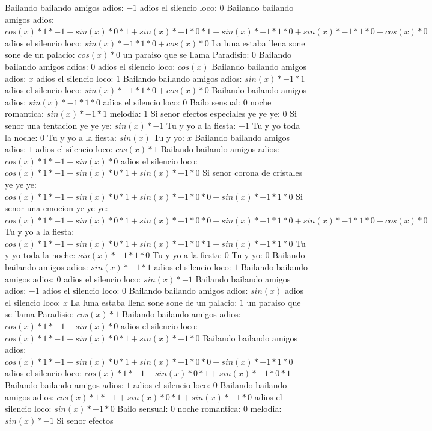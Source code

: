 \documentclass{article}
\begin{document}
Bailando bailando amigos adios: $-1$ adios el silencio loco: $0$  \newline Bailando bailando amigos adios: ${{cos(x)*1*-1+sin(x)*0}*1+sin(x)*-1*0}*1+sin(x)*-1*1*0+sin(x)*-1*1*0+cos(x)*0$  \newline adios el silencio loco: $sin(x)*-1*1*0+cos(x)*0$  \newline La luna estaba llena sone sone de un palacio: $cos(x)*0$ un paraiso que se llama Paradisio: $0$ Bailando bailando amigos adios: $0$  \newline adios el silencio loco: $cos(x)$  \newline Bailando bailando amigos adios: $x$ adios el silencio loco: $1$  \newline Bailando bailando amigos adios: $sin(x)*-1*1$ adios el silencio loco: $sin(x)*-1*1*0+cos(x)*0$ Bailando bailando amigos adios: $sin(x)*-1*1*0$ adios el silencio loco: $0$ Bailo sensual: $0$  \newline noche romantica: $sin(x)*-1*1$ melodia: $1$ Si senor efectos especiales ye ye ye: $0$  \newline Si senor una tentacion ye ye ye: $sin(x)*-1$ Tu y yo a la fiesta: $-1$ Tu y yo toda la noche: $0$  \newline Tu y yo a la fiesta: $sin(x)$  \newline Tu y yo: $x$ Bailando bailando amigos adios: $1$  \newline adios el silencio loco: $cos(x)*1$ Bailando bailando amigos adios: $cos(x)*1*-1+sin(x)*0$ adios el silencio loco: ${cos(x)*1*-1+sin(x)*0}*1+sin(x)*-1*0$ Si senor corona de cristales ye ye ye: ${{cos(x)*1*-1+sin(x)*0}*1+sin(x)*-1*0}*0+sin(x)*-1*1*0$ Si senor una emocion ye ye ye: ${{cos(x)*1*-1+sin(x)*0}*1+sin(x)*-1*0}*0+sin(x)*-1*1*0+sin(x)*-1*1*0+cos(x)*0$ Tu y yo a la fiesta: ${{cos(x)*1*-1+sin(x)*0}*1+sin(x)*-1*0}*1+sin(x)*-1*1*0$  \newline Tu y yo toda la noche: $sin(x)*-1*1*0$ Tu y yo a la fiesta: $0$ Tu y yo: $0$  \newline Bailando bailando amigos adios: $sin(x)*-1*1$ adios el silencio loco: $1$ Bailando bailando amigos adios: $0$  \newline adios el silencio loco: $sin(x)*-1$ Bailando bailando amigos adios: $-1$ adios el silencio loco: $0$  \newline Bailando bailando amigos adios: $sin(x)$  \newline adios el silencio loco: $x$ La luna estaba llena sone sone de un palacio: $1$  \newline un paraiso que se llama Paradisio: $cos(x)*1$ Bailando bailando amigos adios: $cos(x)*1*-1+sin(x)*0$ adios el silencio loco: ${cos(x)*1*-1+sin(x)*0}*1+sin(x)*-1*0$ Bailando bailando amigos adios: ${{cos(x)*1*-1+sin(x)*0}*1+sin(x)*-1*0}*0+sin(x)*-1*1*0$ adios el silencio loco: ${{cos(x)*1*-1+sin(x)*0}*1+sin(x)*-1*0}*1$ Bailando bailando amigos adios: $1$ adios el silencio loco: $0$  \newline Bailando bailando amigos adios: ${cos(x)*1*-1+sin(x)*0}*1+sin(x)*-1*0$  \newline adios el silencio loco: $sin(x)*-1*0$ Bailo sensual: $0$ noche romantica: $0$  \newline melodia: $sin(x)*-1$ Si senor efectos 
\end{document}
